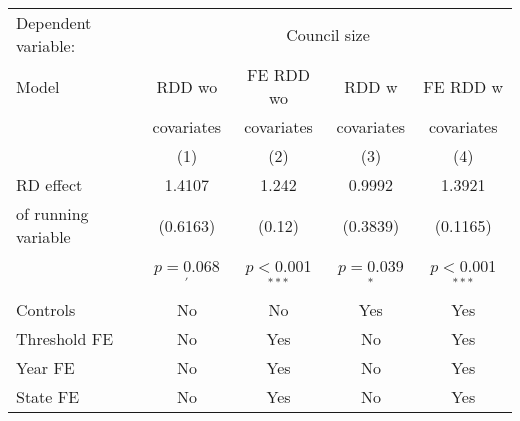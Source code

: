 \begin{tabular}{lcccc}
  \toprule
 \midrule
Dependent variable: & \multicolumn{4}{c}{Council size} \\ 
 Model & \acs{RDD} \acs{wo} & \acs{FE} \acs{RDD} \acs{wo} & \acs{RDD} \acs{w} & \acs{FE} \acs{RDD} \acs{w} \\ 
   &  covariates & covariates & covariates &  covariates \\ 
   & (1) & (2) & (3) & (4) \\ 
   \midrule
\ac{RD} effect & 1.4107 & 1.242 & 0.9992 & 1.3921 \\ 
    of running variable & (0.6163) & (0.12) & (0.3839) & (0.1165) \\ 
    & $p=$0.068$^{'}$ & $p<$0.001$^{***}$ & $p=$0.039$^{*}$ & $p<$0.001$^{***}$ \\ 
   \midrule
Controls & No & No & Yes & Yes \\ 
  Threshold \acs{FE} & No & Yes & No & Yes \\ 
  Year \acs{FE} & No & Yes & No & Yes \\ 
  State \acs{FE} & No & Yes & No & Yes \\ 
   \midrule
 \bottomrule
\end{tabular}
